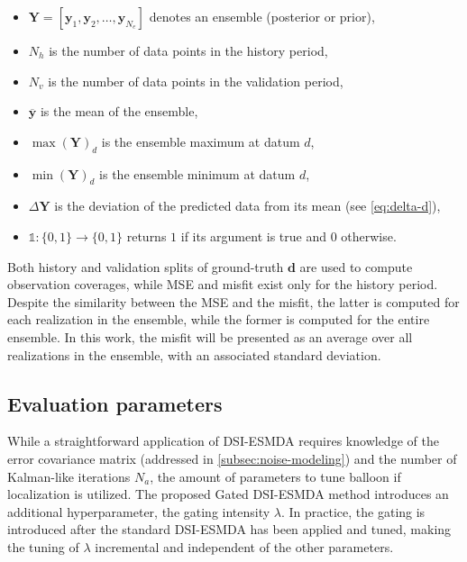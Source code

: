 \begin{itemize}
    \item 
    $\mathbf{Y} = [\mathbf{y}_1, \mathbf{y}_2, \ldots, \mathbf{y}_{N_e}]$ denotes an ensemble (posterior or prior),

    \item
    $N_h$ is the number of data points in the history period, 

    \item
    $N_v$ is the number of data points in the validation period, 

    \item 
    $\overline{\mathbf{y}}$ is the mean of the ensemble, 

    \item 
    $\max(\mathbf{Y})_d$ is the ensemble maximum at datum $d$,

    \item 
    $\min(\mathbf{Y})_d$ is the ensemble minimum at datum $d$, 

    \item 
    $\Delta\mathbf{Y}$ is the deviation of the predicted data from its mean (see \cref{eq:delta-d}),

    \item $\mathbb{1}: \{0, 1\} \to \{0, 1\}$ returns $1$ if its argument is true and $0$ otherwise.
\end{itemize} 

Both history and validation splits of ground-truth $\mathbf{d}$ are used to compute observation coverages, 
while MSE and misfit exist only for the history period.
Despite the similarity between the MSE and the misfit, 
the latter is computed for each realization in the ensemble,
while the former is computed for the entire ensemble.
In this work, the misfit will be presented as an average over all realizations in the ensemble, 
with an associated standard deviation.

\subsection{Evaluation parameters}
\label{subsec:evaluation-parameters}
While a straightforward application of DSI-ESMDA requires knowledge of the error covariance matrix 
(addressed in \cref{subsec:noise-modeling}) and the number of Kalman-like iterations $N_a$,
the amount of parameters to tune balloon if localization is utilized.
%
The proposed Gated DSI-ESMDA method introduces an additional hyperparameter, the gating intensity $\lambda$.
In practice, the gating is introduced after the standard DSI-ESMDA has been applied and tuned, 
making the tuning of $\lambda$ incremental and independent of the other parameters.

